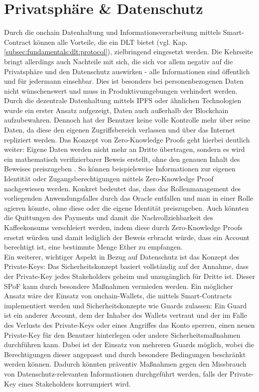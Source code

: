 \section{Privatsphäre \& Datenschutz}
\label{sec:perspective:privacy}
Durch die onchain Datenhaltung und Informationsverarbeitung mittels Smart-Contract können alle Vorteile, die ein \ac{DLT} bietet (vgl. Kap. \ref{subsec:fundamentals:dlt:protocol}), zielbringend eingesetzt werden. Die Kehrseite bringt allerdings auch Nachteile mit sich, die sich vor allem negativ auf die Privatsphäre und den Datenschutz auswirken - alle Informationen sind öffentlich und für jedermann einsehbar. Dies ist besonders bei personenbezogenen Daten nicht wünschenswert und muss in Produktivumgebungen verhindert werden. Durch die dezentrale Datenhaltung mittels \ac{IPFS} oder ähnlichen Technologien wurde ein erster Ansatz aufgezeigt, Daten auch außerhalb der Blockchain aufzubewahren. Dennoch hat der Benutzer keine volle Kontrolle mehr über seine Daten, da diese den eigenen Zugriffsbereich verlassen und über das Internet repliziert werden. Das Konzept von Zero-Knowledge Proofs geht hierbei deutlich weiter: Eigene Daten werden nicht mehr an Dritte übertragen, sondern es wird ein mathematisch verifizierbarer Beweis erstellt, ohne den genauen Inhalt des Beweises preiszugeben \cite{zeroknowledge2020}. So können beispielsweise Informationen zur eigenen Identität oder Zugangsberechtigungen mittels Zero-Knowledge Proof nachgewiesen werden. Konkret bedeutet das, dass das Rollenmanagement des vorliegenden Anwendungsfalles durch das Oracle entfallen und man in einer Rolle agieren könnte, ohne diese oder die eigene Identität preiszugeben. Auch könnten die Quittungen des Payments und damit die Nachvollziehbarkeit des Kaffeekonsums verschleiert werden, indem diese durch Zero-Knowledge Proofs ersetzt würden und damit lediglich der Beweis erbracht würde, dass ein Account berechtigt ist, eine bestimmte Menge Ether zu empfangen.\\
Ein weiterer, wichtiger Aspekt in Bezug auf Datenschutz ist das Konzept des Private-Keys: Das Sicherheitskonzept basiert vollständig auf der Annahme, dass der Private-Key jedes Stakeholders geheim und unzugänglich für Dritte ist. Dieser \ac{SPoF} kann durch besondere Maßnahmen vermieden werden. Ein möglicher Ansatz wäre der Einsatz von onchain-Wallets, die mittels Smart-Contracts implementiert werden und Sicherheitskonzepte wie Guards zulassen: Ein Guard ist ein anderer Account, dem der Inhaber des Wallets vertraut und der im Falle des Verlusts des Private-Keys oder eines Angriffes das Konto sperren, einen neuen Private-Key für den Benutzer hinterlegen oder andere Sicherheitsmaßnahmen durchführen kann. Dabei ist der Einsatz von mehreren Guards möglich, wobei die Berechtigungen dieser angepasst und durch besondere Bedingungen beschränkt werden können. Dadurch könnten präventiv Maßnahmen gegen den Missbrauch von Datenschutz-relevanten Informationen durchgeführt werden, falls der Private-Key eines Stakeholders korrumpiert wird.

